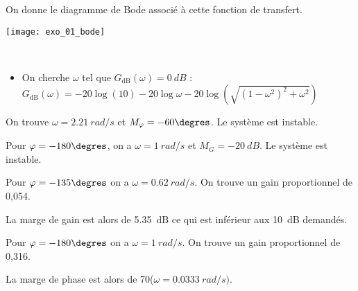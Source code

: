 On donne le diagramme de Bode associé à cette fonction de transfert. 
\begin{center}
\texttt{[image: exo\_01\_bode]}
\end{center}
\fi

\ifprof
\begin{corrige}~\\
\begin{itemize}
\item On cherche $\omega$ tel que $G_{\text{dB}}(\omega)=\SI{0}{dB}$  :
$G_{\text{dB}}(\omega)=-20\log(10) -20\log\omega-20\log\left(\sqrt{(1-\omega^2)^2+\omega^2}\right)$
\end{itemize}

On trouve $\omega=\SI{2,21}{rad/s}$ et $M_{\varphi}=-60\degres$. Le système est instable.
\end{corrige}
\else
\fi

\ifprof
\begin{corrige}
Pour $\varphi=-180\degres$, on a $\omega=\SI{1}{rad/s}$ et $M_{G}=\SI{-20}{dB}$. Le système est instable.
\end{corrige}
\else
\fi

\ifprof
\begin{corrige}
Pour $\varphi=-135\degres$ on a $\omega=\SI{0,62}{rad/s}$. On trouve un gain proportionnel de 0,054.

La marge de gain est alors de \SI{5,35}{dB} ce qui est inférieur aux \SI{10}{dB} demandés.
\end{corrige}
\else
\fi

\ifprof
\begin{corrige}
Pour $\varphi=-180\degres$ on a $\omega=\SI{1}{rad/s}$. On trouve un gain proportionnel de 0,316.

La marge de phase est alors de 70\degres ($\omega=\SI{0,0333}{rad/s})$.
\end{corrige}
\else
\fi


\ifcolle
\else
\ifprof 
\else
{}
\fi
\fi

